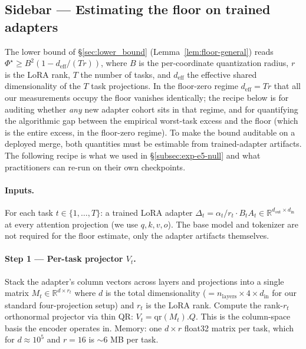 
\subsection*{Sidebar — Estimating the floor on trained adapters}
\label{subsec:floor-recipe}

The lower bound of \S\ref{sec:lower_bound} (Lemma~\ref{lem:floor-general})
reads
$\Phi^\star \geq B^2 \left(1 - d_{\mathrm{eff}} / (Tr)\right)$,
where $B$ is the per-coordinate quantization radius, $r$ is the LoRA
rank, $T$ the number of tasks, and $d_{\mathrm{eff}}$ the effective
shared dimensionality of the $T$ task projections. In the floor-zero
regime $d_{\mathrm{eff}} = Tr$ that all our measurements occupy the
floor vanishes identically; the recipe below is for auditing whether
\emph{any} new adapter cohort sits in that regime, and for quantifying
the algorithmic gap between the empirical worst-task excess and the
floor (which is the entire excess, in the floor-zero regime). To make
the bound auditable on a deployed merge, both quantities must be
estimable from trained-adapter artifacts. The following recipe is what
we used in \S\ref{subsec:exp-e5-null} and what practitioners can
re-run on their own checkpoints.

\paragraph{Inputs.} For each task $t \in \{1, \dots, T\}$: a trained
LoRA adapter $\Delta_t = \alpha_t / r_t \cdot B_t A_t \in
\mathbb{R}^{d_{\mathrm{out}} \times d_{\mathrm{in}}}$ at every
attention projection (we use $q, k, v, o$). The base model and
tokenizer are not required for the floor estimate, only the adapter
artifacts themselves.

\paragraph{Step 1 --- Per-task projector $V_t$.}
Stack the adapter's column vectors across layers and projections into
a single matrix $M_t \in \mathbb{R}^{d \times r_t}$ where $d$ is the
total dimensionality ($= n_{\mathrm{layers}} \times 4 \times
d_{\mathrm{in}}$ for our standard four-projection setup) and $r_t$ is
the LoRA rank. Compute the rank-$r_t$ orthonormal projector via thin
QR: $V_t = \mathrm{qr}(M_t).Q$. This is the column-space basis the
encoder operates in. Memory: one $d \times r$ float32 matrix per task,
which for $d \approx 10^5$ and $r = 16$ is $\sim 6$ MB per task.

